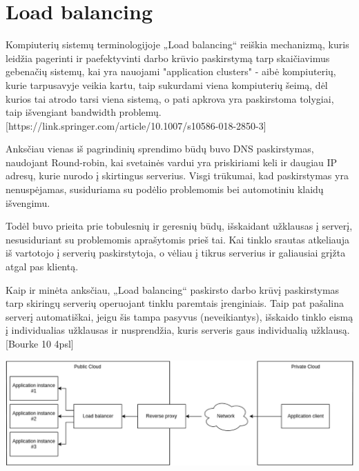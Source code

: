 \documentclass{VUMIFPSkursinis}
\begin{document}
\section{Load balancing}
Kompiuterių sistemų terminologijoje „Load balancing“ reiškia mechanizmą, kuris leidžia pagerinti ir paefektyvinti darbo krūvio paskirstymą tarp skaičiavimus gebenačių sistemų, kai yra nauojami "application clusters" - aibė kompiuterių, kurie tarpusavyje veikia kartu, taip sukurdami viena kompiuterių šeimą, dėl kurios tai atrodo tarsi viena sistemą, o pati apkrova yra paskirstoma tolygiai, taip išvengiant bandwidth problemų.[https://link.springer.com/article/10.1007/s10586-018-2850-3]

Anksčiau vienas iš pagrindinių sprendimo būdų buvo DNS paskirstymas, naudojant Round-robin, kai svetainės vardui yra priskiriami keli ir daugiau IP adresų, kurie nurodo į skirtingus serverius. Visgi trūkumai, kad paskirstymas yra nenuspėjamas, susiduriama su podėlio problemomis bei automotiniu klaidų išvengimu.

Todėl buvo prieita prie tobulesnių ir geresnių būdų, išskaidant užklausas į serverį, nesusiduriant su problemomis aprašytomis prieš tai. Kai tinklo srautas atkeliauja iš vartotojo į serverių paskirstytoja, o vėliau į tikrus serverius ir galiausiai grįžta atgal pas klientą.

Kaip ir minėta anksčiau, „Load balancing“ paskirsto darbo krūvį paskirstymas tarp skiringų serverių operuojant tinklu paremtais įrenginiais. Taip pat pašalina serverį automatiškai, jeigu šis tampa pasyvus (neveikiantys), išskaido tinklo eismą į individualias užklausas ir nusprendžia, kuris serveris gaus individualią užklausą.[Bourke 10 4psl]


\graphicspath{ {./img/} }
 \includegraphics[width=150mm,scale=0.5]{load-balancing}
\end{document}
